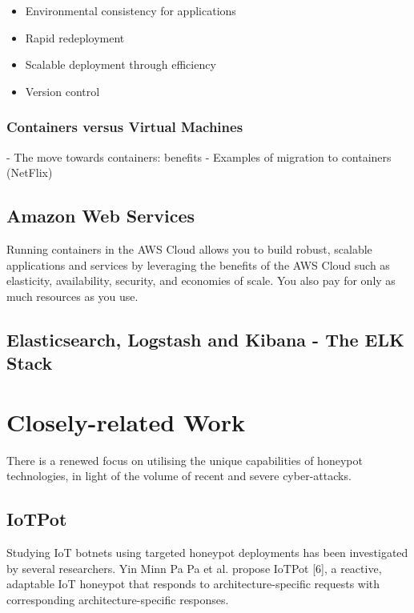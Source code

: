 \begin{itemize}
	\item Environmental consistency for applications
	\item Rapid redeployment
	\item Scalable deployment through efficiency
	\item Version control
\end{itemize}

\subsubsection{Containers versus Virtual Machines}


- The move towards containers: benefits
- Examples of migration to containers (NetFlix)

\subsection{Amazon Web Services}
Running containers in the AWS Cloud allows you to build robust, scalable applications and services by leveraging the benefits of the AWS Cloud such as elasticity, availability, security, and economies of scale. You also pay for only as much resources as you use.


\subsection{Elasticsearch, Logstash and Kibana - The ELK Stack}


\section{Closely-related Work}


There is a renewed focus on utilising the unique capabilities of honeypot technologies, in light of the volume of recent and severe cyber-attacks. 

\subsection{IoTPot}

Studying IoT botnets using targeted honeypot deployments has been investigated by several  researchers. Yin Minn Pa Pa et al. propose IoTPot [6], a reactive, adaptable IoT honeypot that responds to architecture-specific  requests with corresponding architecture-specific responses. 

